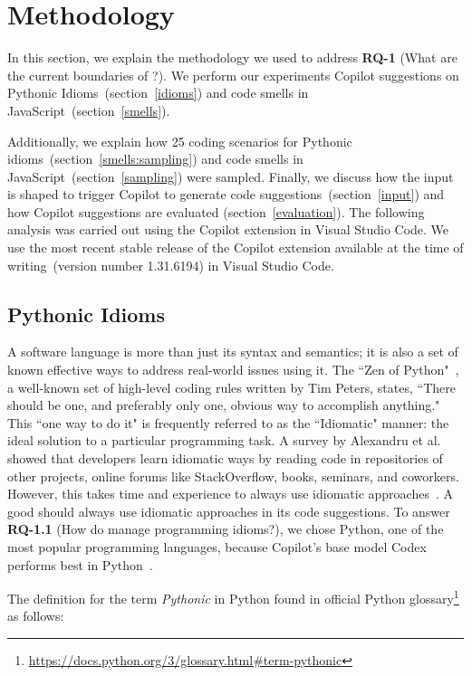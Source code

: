 \section{Methodology}
\label{methodology}
In this section, we explain the methodology we used to address \textbf{RQ-1} (What are the current boundaries of \cct{}?). We perform our experiments Copilot suggestions on Pythonic Idioms~(section~\ref{idioms}) and code smells in JavaScript~(section~\ref{smells}).

Additionally, we explain how 25 coding scenarios for Pythonic idioms~(section~\ref{smells:sampling}) and code smells in JavaScript~(section~\ref{sampling}) were sampled.
Finally, we discuss how the input is shaped to trigger Copilot to generate code suggestions~(section~\ref{input}) and how Copilot suggestions are evaluated (section~\ref{evaluation}).
The following analysis was carried out using the Copilot extension in Visual Studio Code. We use the most recent stable release of the Copilot extension available at the time of writing~(version number 1.31.6194) in Visual Studio Code.

\subsection{Pythonic Idioms}
\label{python}
A software language is more than just its syntax and semantics; it is also a set of known effective ways to address real-world issues using it. 
The ``Zen of Python"~\cite{Peters2010}, a well-known set of high-level coding rules written by Tim Peters, states, ``There should be one, and preferably only one, obvious way to accomplish anything." 
This ``one way to do it" is frequently referred to as the ``Idiomatic" manner: the ideal solution to a particular programming task. 
A survey by Alexandru et al.~\cite{Alexandru2018} showed that developers learn idiomatic ways by reading code in repositories of other projects, online forums like StackOverflow, books, seminars, and coworkers. 
However, this takes time and experience to always use idiomatic approaches~\cite{Alexandru2018}. 
A good \cct{} should always use idiomatic approaches in its code suggestions.
To answer \textbf{RQ-1.1} (How do \cct{} manage programming idioms?),
we chose Python, one of the most popular programming languages, because Copilot's base model Codex performs best in Python~\cite{copilot}.  

The definition for the term \emph{Pythonic} in Python found in official Python glossary\footnote{\url{https://docs.python.org/3/glossary.html\#term-pythonic}\label{pythonic}} as follows:

